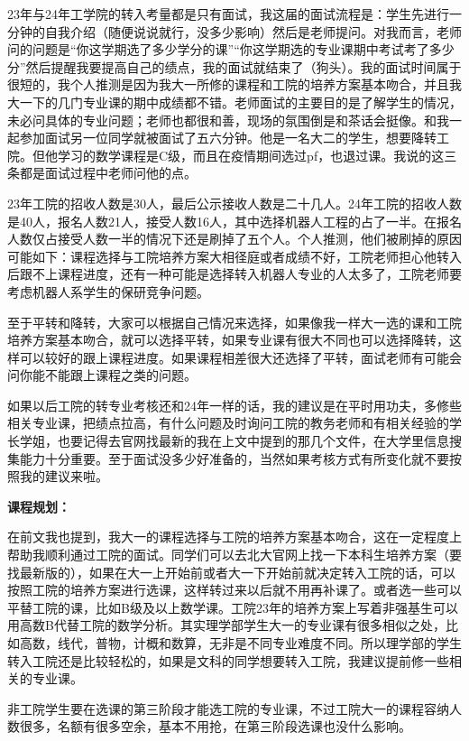 \documentclass[11pt,oneside]{book}
\begin{document}
23年与24年工学院的转入考量都是只有面试，我这届的面试流程是：学生先进行一分钟的自我介绍（随便说说就行，没多少影响）然后是老师提问。对我而言，老师问的问题是“你这学期选了多少学分的课”“你这学期选的专业课期中考试考了多少分”然后提醒我要提高自己的绩点，我的面试就结束了（狗头）。我的面试时间属于很短的，我个人推测是因为我大一所修的课程和工院的培养方案基本吻合，并且我大一下的几门专业课的期中成绩都不错。老师面试的主要目的是了解学生的情况，未必问具体的专业问题；老师也都很和善，现场的氛围倒是和茶话会挺像。和我一起参加面试另一位同学就被面试了五六分钟。他是一名大二的学生，想要降转工院。但他学习的数学课程是C级，而且在疫情期间选过pf，也退过课。我说的这三条都是面试过程中老师问他的点。

23年工院的招收人数是30人，最后公示接收人数是二十几人。24年工院的招收人数是40人，报名人数21人，接受人数16人，其中选择机器人工程的占了一半。在报名人数仅占接受人数一半的情况下还是刷掉了五个人。个人推测，他们被刷掉的原因可能如下：课程选择与工院培养方案大相径庭或者成绩不好，工院老师担心他转入后跟不上课程进度，还有一种可能是选择转入机器人专业的人太多了，工院老师要考虑机器人系学生的保研竞争问题。

至于平转和降转，大家可以根据自己情况来选择，如果像我一样大一选的课和工院培养方案基本吻合，就可以选择平转，如果专业课有很大不同也可以选择降转，这样可以较好的跟上课程进度。如果课程相差很大还选择了平转，面试老师有可能会问你能不能跟上课程之类的问题。

如果以后工院的转专业考核还和24年一样的话，我的建议是在平时用功夫，多修些相关专业课，把绩点拉高，有什么问题及时询问工院的教务老师和有相关经验的学长学姐，也要记得去官网找最新的我在上文中提到的那几个文件，在大学里信息搜集能力十分重要。至于面试没多少好准备的，当然如果考核方式有所变化就不要按照我的建议来啦。

\textbf{\textbf{课程规划}}\textbf{\textbf{：}}

在前文我也提到，我大一的课程选择与工院的培养方案基本吻合，这在一定程度上帮助我顺利通过工院的面试。同学们可以去北大官网上找一下本科生培养方案（要找最新版的），如果在大一上开始前或者大一下开始前就决定转入工院的话，可以按照工院的培养方案进行选课，这样转过来以后就不用再补课了。或者选一些可以平替工院的课，比如B级及以上数学课。工院23年的培养方案上写着非强基生可以用高数B代替工院的数学分析。其实理学部学生大一的专业课有很多相似之处，比如高数，线代，普物，计概和数算，无非是不同专业难度不同。所以理学部的学生转入工院还是比较轻松的，如果是文科的同学想要转入工院，我建议提前修一些相关的专业课。

非工院学生要在选课的第三阶段才能选工院的专业课，不过工院大一的课程容纳人数很多，名额有很多空余，基本不用抢，在第三阶段选课也没什么影响。
\end{document}
